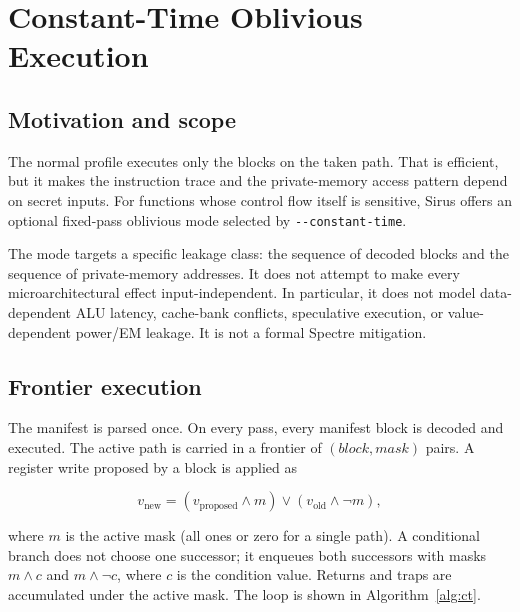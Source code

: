 \section{Constant-Time Oblivious Execution}
\label{sec:constant-time}

\subsection{Motivation and scope}

The normal profile executes only the blocks on the taken path. That is efficient,
but it makes the instruction trace and the private-memory access pattern depend on
secret inputs. For functions whose control flow itself is sensitive, Sirus offers
an optional fixed-pass oblivious mode selected by \verb|--constant-time|.

The mode targets a specific leakage class: the sequence of decoded blocks and the
sequence of private-memory addresses. It does not attempt to make every
microarchitectural effect input-independent. In particular, it does not model
data-dependent ALU latency, cache-bank conflicts, speculative execution, or
value-dependent power/EM leakage. It is not a formal Spectre mitigation.

\subsection{Frontier execution}

The manifest is parsed once. On every pass, every manifest block is decoded and
executed. The active path is carried in a frontier of $(block, mask)$ pairs. A
register write proposed by a block is applied as

\begin{equation}
  v_{\text{new}} = (v_{\text{proposed}} \land m) \lor (v_{\text{old}} \land \lnot m),
  \label{eq:predicated-write}
\end{equation}

where $m$ is the active mask (all ones or zero for a single path). A conditional
branch does not choose one successor; it enqueues both successors with masks
$m \land c$ and $m \land \lnot c$, where $c$ is the condition value. Returns and
traps are accumulated under the active mask. The loop is shown in
Algorithm~\ref{alg:ct}.

